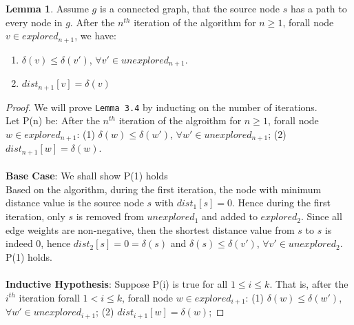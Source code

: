 \documentclass[11pt, oneside]{article}   	%
\newcommand\tab[1][1cm]{\hspace*{#1}}
\theoremstyle{definition}
\newtheorem{sublemma}{Lemma}[section]
\begin{document}
\begin{sublemma}
Assume $g$ is a connected graph, that the source node $s$ has a path to every node in $g$. After the $n^{th}$ iteration of the algorithm for $n \geq 1$, forall node $v \in explored_{n+1}$, we have:
\begin{enumerate}
  \item $\delta(v) \leq \delta(v')$, $\forall v' \in unexplored_{n+1}$.
  \item $dist_{n+1}[v] = \delta(v)$
\end{enumerate}
\end{sublemma}
\begin{proof}
We will prove \texttt{Lemma 3.4} by inducting on the number of iterations. 
\\
Let P(n) be: After the $n^{th}$ iteration of the algroithm for $n \geq 1$, forall node $w \in explored_{n+1}$: (1) $\delta(w) \leq \delta(w')$, $\forall w' \in unexplored_{n+1}$; (2) $dist_{n+1}[w] = \delta(w)$. %
\tab\\\\
\textbf{Base Case}: We shall show P(1) holds \\
Based on the algorithm, during the first iteration, the node with minimum distance value is the source node $s$ with $dist_1[s] = 0$. Hence during the first iteration, only $s$ is removed from $unexplored_1$ and added to $explored_2$. Since all edge weights are non-negative, then the shortest distance value from $s$ to $s$ is indeed $0$, hence $dist_2[s] = 0 = \delta(s)$ and $\delta(s) \leq \delta(v')$, $\forall v' \in unexplored_2$. 
\\
P(1) holds.
\\\\
\textbf{Inductive Hypothesis}: Suppose P(i) is true for all $1 \leq i \leq k$. That is, after the $i^{th}$ iteration forall $1 < i \leq k$, forall node $w \in explored_{i+1}$: (1) $\delta(w) \leq \delta(w')$, $\forall w' \in unexplored_{i+1}$; (2) $dist_{i+1}[w] = \delta(w)$; %

\end{proof}
\end{document}

